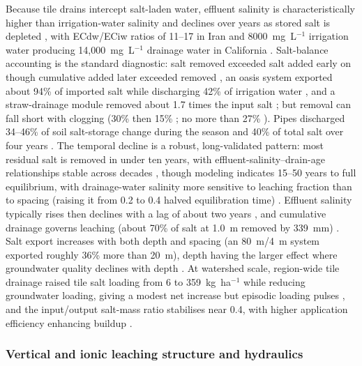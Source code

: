 \documentclass[11pt]{article}
\begin{document}
Because tile drains intercept salt-laden water, effluent salinity is
characteristically higher than irrigation-water salinity and declines over years
as stored salt is depleted \parencite{Li2022,Karegoudar2022}, with ECdw/ECiw
ratios of 11--17 in Iran \parencite{Akram2013} and 8000~mg~L$^{-1}$ irrigation
water producing 14{,}000~mg~L$^{-1}$ drainage water in California
\parencite{KARAJEH1994c}. Salt-balance accounting is the standard diagnostic:
salt removed exceeded salt added early on though cumulative added later exceeded
removed \parencite{Manjunatha2004}, an oasis system exported about 94\% of
imported salt while discharging 42\% of irrigation water \parencite{Askri2022},
and a straw-drainage module removed about 1.7 times the input salt
\parencite{Lu2019}; but removal can fall short with clogging (30\% then 15\%
\parencite{BenAissa2013}; no more than 27\% \parencite{HajAmor2019}). Pipes
discharged 34--46\% of soil salt-storage change during the season
\parencite{Liu2025c} and 40\% of total salt over four years \parencite{Heng2021}.
The temporal decline is a robust, long-validated pattern: most residual salt is
removed in under ten years, with effluent-salinity--drain-age relationships stable
across decades \parencite{JOHNSTON1993}, though modeling indicates 15--50 years
to full equilibrium, with drainage-water salinity more sensitive to leaching
fraction than to spacing (raising it from 0.2 to 0.4 halved equilibration time)
\parencite{Kelleners2000}. Effluent salinity typically rises then declines with a
lag of about two years \parencite{Manjunatha2004,Sharma2006,Jayawardane2001}, and
cumulative drainage governs leaching (about 70\% of salt at 1.0~m removed by
339~mm) \parencite{Bahçeci2009}. Salt export increases with both depth and
spacing (an 80~m/4~m system exported roughly 36\% more than 20~m), depth having
the larger effect where groundwater quality declines with depth
\parencite{GRISMER1993,KAMRA1991,KAMRA1994}. At watershed scale, region-wide tile
drainage raised tile salt loading from 6 to 359~kg~ha$^{-1}$ while reducing
groundwater loading, giving a modest net increase but episodic loading pulses
\parencite{Addab2022}, and the input/output salt-mass ratio stabilises near 0.4,
with higher application efficiency enhancing buildup \parencite{KARAJEH1994c}.

\subsubsection{Vertical and ionic leaching structure and hydraulics}
\end{document}
